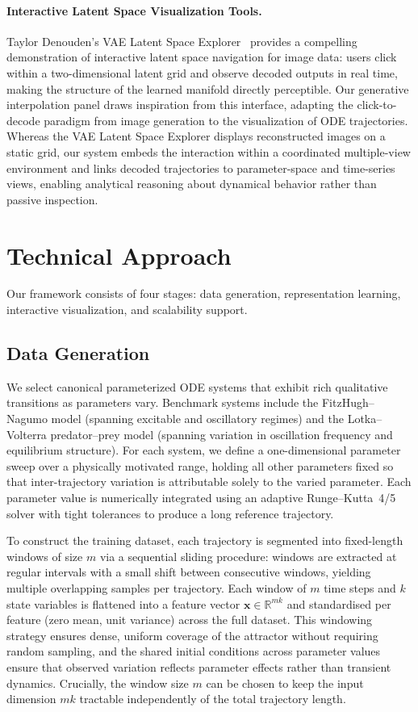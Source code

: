\documentclass{article}
\begin{document}
\paragraph{Interactive Latent Space Visualization Tools.}
Taylor Denouden's VAE Latent Space
Explorer~\cite{denouden2017vaexplorer} provides a compelling demonstration of
interactive latent space navigation for image data: users click within a
two-dimensional latent grid and observe decoded outputs in real time, making
the structure of the learned manifold directly perceptible. Our generative
interpolation panel draws inspiration from this interface, adapting the
click-to-decode paradigm from image generation to the visualization of ODE
trajectories. Whereas the VAE Latent Space Explorer displays reconstructed
images on a static grid, our system embeds the interaction within a
coordinated multiple-view environment and links decoded trajectories to
parameter-space and time-series views, enabling analytical reasoning about
dynamical behavior rather than passive inspection.
    

\section{Technical Approach}

Our framework consists of four stages: data generation, representation
learning, interactive visualization, and scalability support.

\subsection{Data Generation}
We select canonical parameterized ODE systems that exhibit rich qualitative
transitions as parameters vary. Benchmark systems include the
FitzHugh--Nagumo model (spanning excitable and oscillatory regimes) and the
Lotka--Volterra predator--prey model (spanning variation in oscillation
frequency and equilibrium structure). For each system, we define a
one-dimensional parameter sweep over a physically motivated range, holding
all other parameters fixed so that inter-trajectory variation is attributable
solely to the varied parameter. Each parameter value is numerically integrated
using an adaptive Runge--Kutta~4/5 solver with tight tolerances to produce a
long reference trajectory.

\medskip

To construct the training dataset, each trajectory is segmented into
fixed-length windows of size $m$ via a sequential sliding procedure: windows
are extracted at regular intervals with a small shift between consecutive
windows, yielding multiple overlapping samples per trajectory. Each window
of $m$ time steps and $k$ state variables is flattened into a feature vector
$\mathbf{x} \in \mathbb{R}^{mk}$ and standardised per feature (zero mean,
unit variance) across the full dataset. This windowing strategy ensures dense,
uniform coverage of the attractor without requiring random sampling, and the
shared initial conditions across parameter values ensure that observed
variation reflects parameter effects rather than transient dynamics. Crucially,
the window size $m$ can be chosen to keep the input dimension $mk$ tractable
independently of the total trajectory length.
\end{document}
